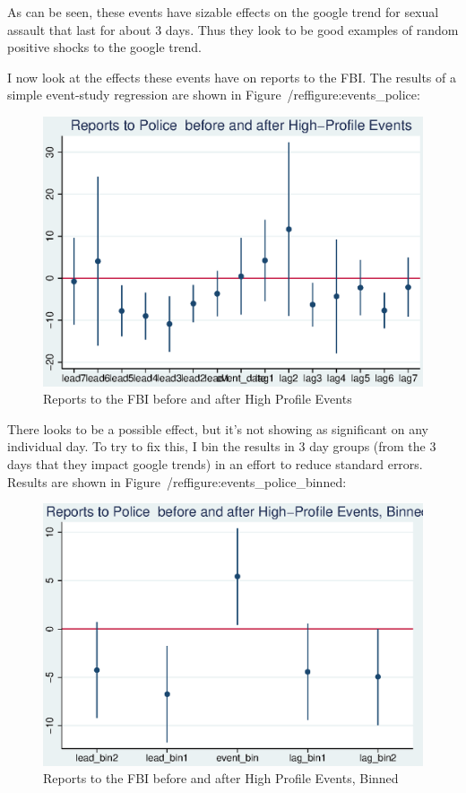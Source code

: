 \documentclass[AER,draftmode]{AEA}
\begin{document}
As can be seen, these events have sizable effects on the google trend for sexual assault that last for about 3 days. Thus they look to be good examples of random positive shocks to the google trend. 

I now look at the effects these events have on reports to the FBI. The results of a simple event-study regression are shown in Figure~/ref{figure:events_police}:

\begin{figure}
\includegraphics[]{figures/events_police.eps}
\caption{Reports to the FBI before and after High Profile Events} \label{figure:events_police}
\end{figure}

There looks to be a possible effect, but it's not showing as significant on any individual day. To try to fix this, I bin the results in 3 day groups (from the 3 days that they impact google trends) in an effort to reduce standard errors. Results are shown in Figure~/ref{figure:events_police_binned}:

\begin{figure}
\includegraphics[]{figures/events_police_binned.eps}
\caption{Reports to the FBI before and after High Profile Events, Binned} \label{figure:events_police_binned}
\end{figure}
\end{document}
